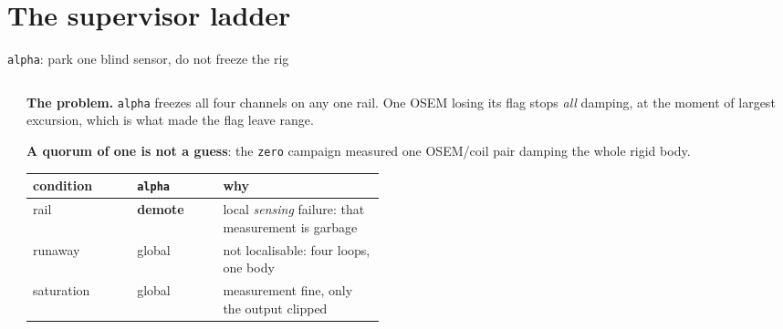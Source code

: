 \documentclass[aspectratio=169]{beamer}
\begin{document}
\section{The supervisor ladder}

\begin{frame}{\texttt{alpha}: park one blind sensor, do not freeze the rig}
  \begin{columns}[T]
    \begin{column}{0.44\textwidth}
      \centering
    \end{column}
    \begin{column}{0.54\textwidth}
      \footnotesize
      \textbf{The problem.} \texttt{alpha} freezes all four channels on any one rail. One
      OSEM losing its flag stops \emph{all} damping, at the moment of
      largest excursion, which is what made the flag leave range.

      \vspace{2mm}
      \textbf{A quorum of one is not a guess}: the \texttt{zero} campaign measured one
      OSEM/coil pair damping the whole rigid body.

      \vspace{2mm}
      {\scriptsize\setlength{\tabcolsep}{4pt}
      \begin{tabular}{@{}ll>{\raggedright\arraybackslash}p{0.46\linewidth}@{}}
        \toprule
        condition & \texttt{alpha} & why \\
        \midrule
        rail & \textbf{demote} & local \emph{sensing} failure: that measurement
          is garbage \\
        runaway & global & not localisable: four loops, one body \\
        saturation & global & measurement fine, only the output clipped \\
        \bottomrule
      \end{tabular}}


\end{column}
\end{columns}
\end{frame}
\end{document}
